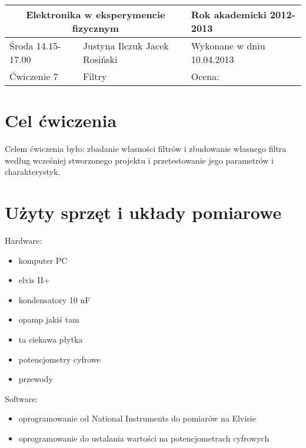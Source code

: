 \documentclass[a4paper,11pt]{article}
\author{Justyna Ilczuk, Jacek Rosiński}
\begin{document}
\begin{center}

    \begin{tabular}{ | m{5cm}| m{5cm} | m{5cm} |}
    \hline 
    \multicolumn{2}{|c|}{Elektronika w eksperymencie fizycznym}
    & Rok akademicki 2012-2013 \\ 
    
    \hline
    Środa 14.15-17.00 
    & Justyna Ilczuk \newline Jacek Rosiński
    & Wykonane w dniu 10.04.2013 \\
   	
   	\hline
   	Ćwiczenie 7 & Filtry &    Ocena: \\
   	\hline
    \end{tabular}
\end{center}

\pagestyle{fancy}
\fancyfoot[CO]{\ }
\fancyhead[RO]{\footnotesize{\thepage} }




\section{Cel ćwiczenia}
Celem ćwiczenia było:
zbadanie własności filtrów i zbudowanie własnego filtra według wcześniej stworzonego projektu i przetestowanie jego parametrów i charakterystyk.

\section{Użyty sprzęt i układy pomiarowe}

Hardware:
\begin{itemize}
\item komputer PC
\item elvis II+
\item kondensatory 10 nF
\item opamp jakiś tam
\item ta ciekawa płytka
\item potencjometry cyfrowe
\item przewody
\end{itemize}

Software:
\begin{itemize}
\item oprogramowanie od National Instruments do pomiarów na Elvisie
\item oprogramowanie do ustalania wartości na potencjometrach cyfrowych
\end{itemize}
\end{document}

